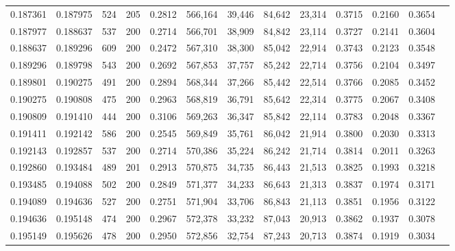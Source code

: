 \begin{tabular}{rrrrrrrrrrrrr}
0.187361 & 0.187975 &   524 & 205 &                                     0.2812 & 566,164 &  39,446 &  84,642 &  23,314 & 0.3715 & 0.2160 & 0.3654 \\
0.187977 & 0.188637 &   537 & 200 &                                     0.2714 & 566,701 &  38,909 &  84,842 &  23,114 & 0.3727 & 0.2141 & 0.3604 \\
0.188637 & 0.189296 &   609 & 200 &                                     0.2472 & 567,310 &  38,300 &  85,042 &  22,914 & 0.3743 & 0.2123 & 0.3548 \\
0.189296 & 0.189798 &   543 & 200 &                                     0.2692 & 567,853 &  37,757 &  85,242 &  22,714 & 0.3756 & 0.2104 & 0.3497 \\
0.189801 & 0.190275 &   491 & 200 &                                     0.2894 & 568,344 &  37,266 &  85,442 &  22,514 & 0.3766 & 0.2085 & 0.3452 \\
0.190275 & 0.190808 &   475 & 200 &                                     0.2963 & 568,819 &  36,791 &  85,642 &  22,314 & 0.3775 & 0.2067 & 0.3408 \\
0.190809 & 0.191410 &   444 & 200 &                                     0.3106 & 569,263 &  36,347 &  85,842 &  22,114 & 0.3783 & 0.2048 & 0.3367 \\
0.191411 & 0.192142 &   586 & 200 &                                     0.2545 & 569,849 &  35,761 &  86,042 &  21,914 & 0.3800 & 0.2030 & 0.3313 \\
0.192143 & 0.192857 &   537 & 200 &                                     0.2714 & 570,386 &  35,224 &  86,242 &  21,714 & 0.3814 & 0.2011 & 0.3263 \\
0.192860 & 0.193484 &   489 & 201 &                                     0.2913 & 570,875 &  34,735 &  86,443 &  21,513 & 0.3825 & 0.1993 & 0.3218 \\
0.193485 & 0.194088 &   502 & 200 &                                     0.2849 & 571,377 &  34,233 &  86,643 &  21,313 & 0.3837 & 0.1974 & 0.3171 \\
0.194089 & 0.194636 &   527 & 200 &                                     0.2751 & 571,904 &  33,706 &  86,843 &  21,113 & 0.3851 & 0.1956 & 0.3122 \\
0.194636 & 0.195148 &   474 & 200 &                                     0.2967 & 572,378 &  33,232 &  87,043 &  20,913 & 0.3862 & 0.1937 & 0.3078 \\
0.195149 & 0.195626 &   478 & 200 &                                     0.2950 & 572,856 &  32,754 &  87,243 &  20,713 & 0.3874 & 0.1919 & 0.3034 \\

\end{tabular}
